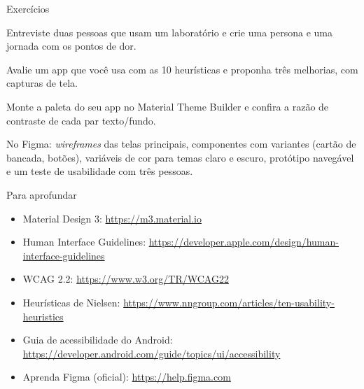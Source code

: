 \documentclass[aspectratio=169,10pt]{beamer}
\begin{document}
\begin{frame}{Exercícios}
  \begin{exercicio}
    Entreviste duas pessoas que usam um laboratório e crie uma persona e uma jornada com os pontos de dor.
  \end{exercicio}
  \begin{exercicio}
    Avalie um app que você usa com as 10 heurísticas e proponha três melhorias, com capturas de tela.
  \end{exercicio}
  \begin{exercicio}
    Monte a paleta do seu app no Material Theme Builder e confira a razão de contraste de cada par texto/fundo.
  \end{exercicio}
  \begin{projeto}
    No Figma: \emph{wireframes} das telas principais, componentes com variantes (cartão de bancada, botões), variáveis de cor para temas claro e escuro, protótipo navegável e um teste de usabilidade com três pessoas.
  \end{projeto}
\end{frame}

\begin{frame}{Para aprofundar}
  \small
  \begin{itemize}
    \item Material Design 3: \url{https://m3.material.io}
    \item Human Interface Guidelines: \url{https://developer.apple.com/design/human-interface-guidelines}
    \item WCAG 2.2: \url{https://www.w3.org/TR/WCAG22}
    \item Heurísticas de Nielsen: \url{https://www.nngroup.com/articles/ten-usability-heuristics}
    \item Guia de acessibilidade do Android: \url{https://developer.android.com/guide/topics/ui/accessibility}
    \item Aprenda Figma (oficial): \url{https://help.figma.com}
  \end{itemize}
\end{frame}
\end{document}
